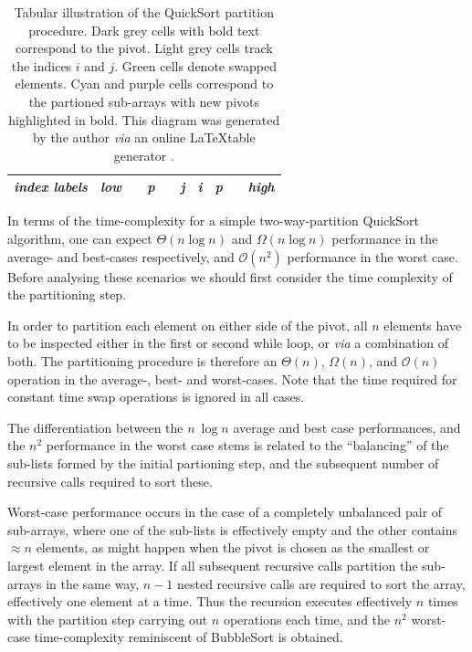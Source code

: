 \documentclass[12pt,a4paper]{article}
\begin{document}
\begin{landscape}
\begin{table}[]
\begin{center}
\begin{tabular}{|c|c|c|c|c|c|c|c|c|c|}
{\color[HTML]{000000} \textit{\textbf{index labels}}}                                                                                          & {\color[HTML]{000000} \textit{\textbf{low}}}        & {\color[HTML]{000000} \textit{\textbf{}}}           & {\color[HTML]{000000} \textit{\textbf{p}}}                & {\color[HTML]{000000} \textit{\textbf{}}}           & {\color[HTML]{000000} \textit{\textbf{j}}}                & {\color[HTML]{000000} \textit{\textbf{i}}}          & {\color[HTML]{000000} \textit{\textbf{p}}}                         & {\color[HTML]{000000} \textit{\textbf{}}}           & {\color[HTML]{000000} \textit{\textbf{high}}}       \\ \hline
\end{tabular}
\caption{Tabular illustration of the QuickSort partition procedure. Dark grey cells with bold text correspond to the pivot. Light grey cells track the indices $i$ and $j$. Green cells denote swapped elements. Cyan and purple cells correspond to the partioned sub-arrays with new pivots highlighted in bold. This diagram was generated by the author \emph{via} an online \LaTeX table generator \cite{latexTableGenerator}.}
\label{quickSortDiagram}
\end{center}
\end{table}
\end{landscape}

In terms of the time-complexity for a simple two-way-partition QuickSort algorithm, one can expect $\Theta(n \log n)$ and $\Omega(n \log n)$ performance in the average- and best-cases respectively, and $\mathcal{O}(n^2)$ performance in the worst case.  Before analysing these scenarios we should first consider the time complexity of the partitioning step. 

In order to partition each element on either side of the pivot, all $n$ elements have to be inspected either in the first or second while loop, or \emph{via} a combination of both. The partitioning procedure is therefore an $\Theta(n)$, $\Omega(n)$, and $\mathcal{O}(n)$ operation in the average-, best- and worst-cases. Note that the time required for constant time swap operations is ignored in all cases.

The differentiation between the $n\mathrm{\ \log}n$ average and best case performances, and the $n^2$ performance in the worst case stems is related to the ``balancing'' of the sub-lists formed by the initial partioning step, and the subsequent number of recursive calls required to sort these.

Worst-case performance occurs in the case of a completely unbalanced pair of sub-arrays, where one of the sub-lists is effectively empty and the other contains $\approx n$ elements, as might happen when the pivot is chosen as the smallest or largest element in the array. If all subsequent recursive calls partition the sub-arrays in the same way, $n-1$ nested recursive calls are required to sort the array, effectively one element at a time. Thus the recursion executes effectively $n$ times with the partition step carrying out $n$ operations each time, and the $n^2$ worst-case time-complexity reminiscent of BubbleSort is obtained. 
\end{document}
